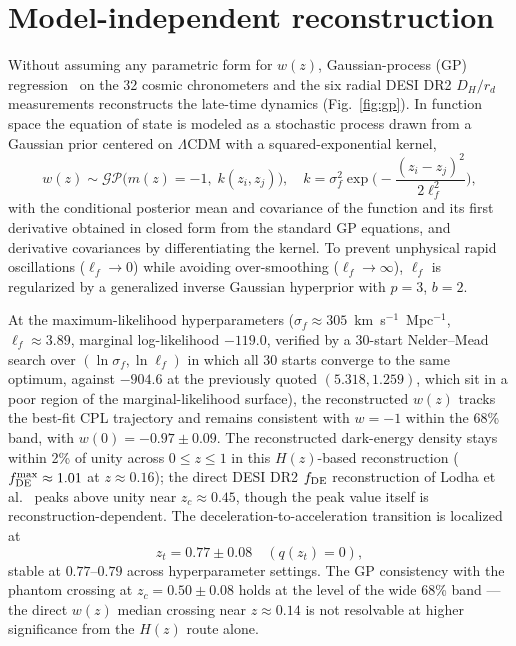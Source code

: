 \documentclass[aps,prd,preprint,superscriptaddress,nofootinbib]{revtex4-2}
\begin{document}
\section{Model-independent reconstruction}
\label{sec:recon}

Without assuming any parametric form for $w(z)$, Gaussian-process (GP) regression~\cite{Lodha2025} on the 32 cosmic chronometers and the six radial DESI DR2 $D_H/r_d$ measurements reconstructs the late-time dynamics (Fig.~\ref{fig:gp}). In function space the equation of state is modeled as a stochastic process drawn from a Gaussian prior centered on $\Lambda$CDM with a squared-exponential kernel,
\begin{equation}
w(z) \sim \mathcal{GP}\big(m(z) = -1,\; k(z_i, z_j)\big), \quad k = \sigma_f^2 \exp\!\Big(-\frac{(z_i - z_j)^2}{2 \ell_f^2}\Big),
\label{eq:gpkernel}
\end{equation}
with the conditional posterior mean and covariance of the function and its first derivative obtained in closed form from the standard GP equations, and derivative covariances by differentiating the kernel. To prevent unphysical rapid oscillations ($\ell_f \to 0$) while avoiding over-smoothing ($\ell_f \to \infty$), $\ell_f$ is regularized by a generalized inverse Gaussian hyperprior with $p = 3$, $b = 2$.

At the maximum-likelihood hyperparameters ($\sigma_f \approx 305$~km~s$^{-1}$~Mpc$^{-1}$, $\ell_f \approx 3.89$, marginal log-likelihood $-119.0$, verified by a 30-start Nelder--Mead search over $(\ln \sigma_f, \ln \ell_f)$ in which all 30 starts converge to the same optimum, against $-904.6$ at the previously quoted $(5.318, 1.259)$, which sit in a poor region of the marginal-likelihood surface), the reconstructed $w(z)$ tracks the best-fit CPL trajectory and remains consistent with $w = -1$ within the 68\% band, with $w(0) = -0.97 \pm 0.09$. The reconstructed dark-energy density stays within 2\% of unity across $0 \le z \le 1$ in this $H(z)$-based reconstruction ($f_{\rm DE}^{\max} \approx 1.01$ at $z \approx 0.16$); the direct DESI DR2 $f_{\rm DE}$ reconstruction of Lodha et al.~\cite{Lodha2025} peaks above unity near $z_c \approx 0.45$, though the peak value itself is reconstruction-dependent. The deceleration-to-acceleration transition is localized at
\begin{equation}
z_t = 0.77 \pm 0.08 \quad (q(z_t) = 0),
\end{equation}
stable at $0.77$--$0.79$ across hyperparameter settings. The GP consistency with the phantom crossing at $z_c = 0.50 \pm 0.08$ holds at the level of the wide 68\% band --- the direct $w(z)$ median crossing near $z \approx 0.14$ is not resolvable at higher significance from the $H(z)$ route alone.
\end{document}
